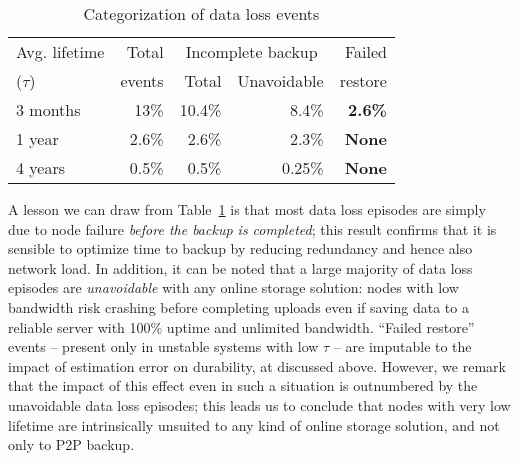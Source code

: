 \begin{table}
\centering

\caption{Categorization of data loss events}
\label{tab:dataloss}
\begin{tabular}{|l||r||r|r|r|}
\hline
Avg. lifetime & Total & \multicolumn{2}{|c|}{Incomplete backup} &Failed \\
\cline{3-4}
($\tau$)         & events       & Total  & Unavoidable&restore \\
\hline
\hline

3 months & 13\% & 10.4\% & 8.4\%  & \textbf{2.6\%} \\

\hline


1 year & 2.6\%  & 2.6\% & 2.3\% & \textbf{None} \\

\hline

4 years & 0.5\%  & 0.5\% & 0.25\% & \textbf{None} \\

\hline

\end{tabular}
\end{table}

A lesson we can draw from Table~\ref{tab:dataloss} is that most data
loss episodes are simply due to node failure \emph{before the backup
is completed}; this result confirms that it is sensible to optimize
time to backup by reducing redundancy and hence also network load. In
addition, it can be noted that a large majority of data loss episodes
are \emph{unavoidable} with any online storage solution: nodes with
low bandwidth risk crashing before completing uploads even if saving
data to a reliable server with 100\% uptime and unlimited bandwidth.
``Failed restore'' events -- present only in unstable systems with low
$\tau$ -- are imputable to the impact of estimation error on
durability, at discussed above. However, we remark that the impact of
this effect even in such a situation is outnumbered by the unavoidable
data loss episodes; this leads us to conclude that nodes with very low
lifetime are intrinsically unsuited to any kind of online storage
solution, and not only to P2P backup.




